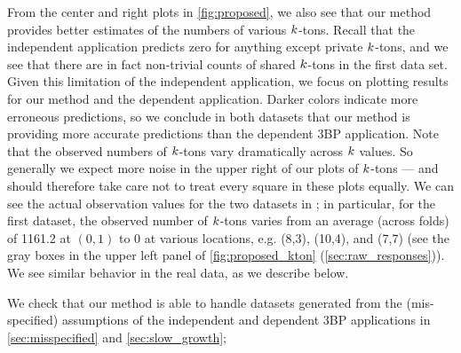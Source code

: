 From the center and right plots in \cref{fig:proposed}, we also see that our method provides better estimates of the numbers of various $\vecoccurrence$-tons. Recall that the independent application predicts zero for anything except private $\vecoccurrence$-tons, and we see that there are in fact non-trivial counts of shared $\vecoccurrence$-tons in the first data set. Given this limitation of the independent application, we focus on plotting results for our method and the dependent application. Darker colors indicate more erroneous predictions, so we conclude in both datasets that our method is providing more accurate predictions than the dependent 3BP application. Note that the observed numbers of $\vecoccurrence$-tons vary dramatically across $\vecoccurrence$ values. So generally we expect more noise in the upper right of our plots of $\vecoccurrence$-tons --- and should therefore take care not to treat every square in these plots equally. We can see the actual observation values for the two datasets in ; in particular, for the first dataset, the observed number of $\vecoccurrence$-tons varies from an average (across folds) of 1161.2 at $(0,1)$ to 0 at various locations, e.g. (8,3), (10,4), and (7,7) (see the gray boxes in the upper left panel of \cref{fig:proposed_kton} (\cref{sec:raw_responses})).  We see similar behavior in the real data, as we describe below.

We check that our method is able to handle datasets generated from the (mis-specified) assumptions of the independent and dependent 3BP applications in \cref{sec:misspecified} and \cref{sec:slow_growth}; 

